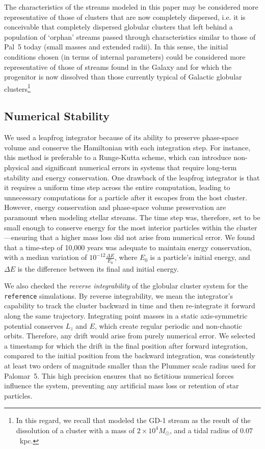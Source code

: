 \documentclass{aa}
\begin{document}
The characteristics of the streams modeled in this paper may be considered more representative of those of clusters that are now completely dispersed, i.e. it is conceivable that completely dispersed globular clusters that left behind a population of `orphan' streams passed through characteristics similar to those of Pal~5 today (small masses and extended radii). In this sense, the initial conditions chosen (in terms of internal parameters) could be considered more representative of those of streams found in the Galaxy and for which the progenitor is now dissolved \citep[see, for example, the population of streams without progenitors described by][]{2024ApJ...967...89I} than those currently typical of Galactic globular clusters\footnote{In this regard, we recall that \citet{2014ApJ...795...95B} modeled the GD-1 stream as the result of the dissolution of a cluster with a mass of $2 \times 10^4 M_\odot$, and a tidal radius of $0.07$~kpc.}




  \subsection{Numerical Stability}\label{num_quality}

    We used a leapfrog integrator because of its ability to preserve phase-space volume and conserve the Hamiltonian with each integration step. For instance, this method is preferable to a Runge-Kutta scheme, which can introduce non-physical and significant numerical errors in systems that require long-term stability and energy conservation. One drawback of the leapfrog integrator is that it requires a uniform time step across the entire computation, leading to unnecessary computations for a particle after it escapes from the host cluster. However, energy conservation and phase-space volume preservation are paramount when modeling stellar streams. The time step was, therefore, set to be small enough to conserve energy for the most interior particles within the cluster---ensuring that a higher mass loss did not arise from numerical error. We found that a time-step of 10,000 years was adequate to maintain energy conservation, with a median variation of $10^{-12} \frac{\Delta E}{E_0}$, where $E_0$ is a particle's initial energy, and $\Delta E$ is the difference between its final and initial energy. 
    
    We also checked the \textit{reverse integrability} of the globular cluster system for the \texttt{reference} simulations. By reverse integrability, we mean the integrator's capability to track the cluster backward in time and then re-integrate it forward along the same trajectory. Integrating point masses in a static axis-symmetric potential conserves $L_z$ and $E$, which create regular periodic and non-chaotic orbits. Therefore, any drift would arise from purely numerical error. We selected a timestamp for which the drift in the final position after forward integration, compared to the initial position from the backward integration, was consistently at least two orders of magnitude smaller than the Plummer scale radius used for Palomar~5. This high precision ensures that no fictitious numerical forces influence the system, preventing any artificial mass loss or retention of star particles.
\end{document}
